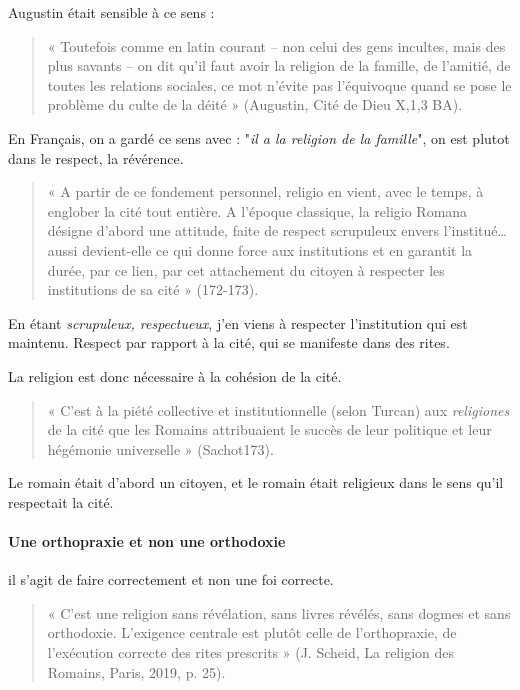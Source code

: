 Augustin était sensible à ce sens : 
\begin{quote}
     « Toutefois comme en latin courant – non celui des gens incultes, mais des plus savants – on dit qu’il faut avoir la religion de la famille, de l’amitié, de toutes les relations sociales, ce mot n’évite pas l’équivoque quand se pose le problème du culte de la déité » (Augustin, Cité de Dieu X,1,3 BA).
\end{quote}
\begin{Ex}
En Français, on a gardé ce sens avec : 
"\textit{il a la religion de la famille}", on est plutot dans le respect, la révérence.

\end{Ex}


\begin{quote}
     «  A partir de ce fondement personnel, religio en vient, avec le temps, à englober la cité tout entière. A l’époque classique, la religio Romana désigne d’abord une attitude, faite de respect scrupuleux envers l’institué… aussi devient-elle ce qui donne force aux institutions et en garantit la durée, par ce lien, par cet attachement du citoyen à respecter les institutions de sa cité » (172-173).
\end{quote}

En étant \textit{scrupuleux, respectueux}, j'en viens à respecter l'institution qui est maintenu. Respect par rapport à la cité, qui se manifeste dans des rites. 

La religion est donc nécessaire à la cohésion de la cité. 
\begin{quote}
    « C’est à la piété collective et institutionnelle (selon Turcan) aux \textit{religiones} de la cité que les Romains attribuaient le succès de leur politique et leur hégémonie universelle » (Sachot173). 
\end{quote}
Le romain était d'abord un citoyen, et le romain était religieux dans le sens qu'il respectait la cité.


\paragraph{Une orthopraxie et non une orthodoxie} il s'agit de faire correctement et non une foi correcte.
\begin{quote}
     « C’est une religion sans révélation, sans livres révélés, sans dogmes et sans orthodoxie. L’exigence centrale est plutôt celle de l’orthopraxie, de l’exécution correcte des rites prescrits » (J. Scheid,  La religion des Romains, Paris, 2019, p. 25). 
\end{quote}


